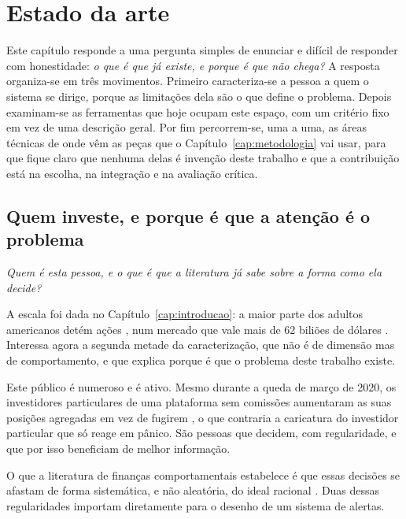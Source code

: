 
\chapter{Estado da arte}
\label{cap:contexto}

Este capítulo responde a uma pergunta simples de enunciar e difícil de responder com honestidade:
\emph{o que é que já existe, e porque é que não chega?} A resposta organiza-se em três movimentos.
Primeiro caracteriza-se a pessoa a quem o sistema se dirige, porque as limitações dela são o que
define o problema. Depois examinam-se as ferramentas que hoje ocupam este espaço, com um critério
fixo em vez de uma descrição geral. Por fim percorrem-se, uma a uma, as áreas técnicas de onde vêm
as peças que o Capítulo~\ref{cap:metodologia} vai usar, para que fique claro que nenhuma delas é
invenção deste trabalho e que a contribuição está na escolha, na integração e na avaliação crítica.

\section{Quem investe, e porque é que a atenção é o problema}
\label{sec:ctx_investidor}

\emph{Quem é esta pessoa, e o que é que a literatura já sabe sobre a forma como ela decide?}

A escala foi dada no Capítulo~\ref{cap:introducao}: a maior parte dos adultos americanos detém
ações \autocite{gallup2025stock}, num mercado que vale mais de 62 biliões de dólares
\autocite{sifma2025factbook}. Interessa agora a segunda metade da caracterização, que não é de
dimensão mas de comportamento, e que explica porque é que o problema deste trabalho existe.

Este público é numeroso e é ativo. Mesmo durante a queda de março de 2020, os investidores
particulares de uma plataforma sem comissões aumentaram as suas posições agregadas em vez de fugirem
\autocite{welch2022robinhood}, o que contraria a caricatura do investidor particular que só reage em
pânico. São pessoas que decidem, com regularidade, e que por isso beneficiam de melhor informação.

O que a literatura de finanças comportamentais estabelece é que essas decisões se afastam de forma
sistemática, e não aleatória, do ideal racional \autocite{barberis2003behavioral}. Duas dessas
regularidades importam diretamente para o desenho de um sistema de alertas.

